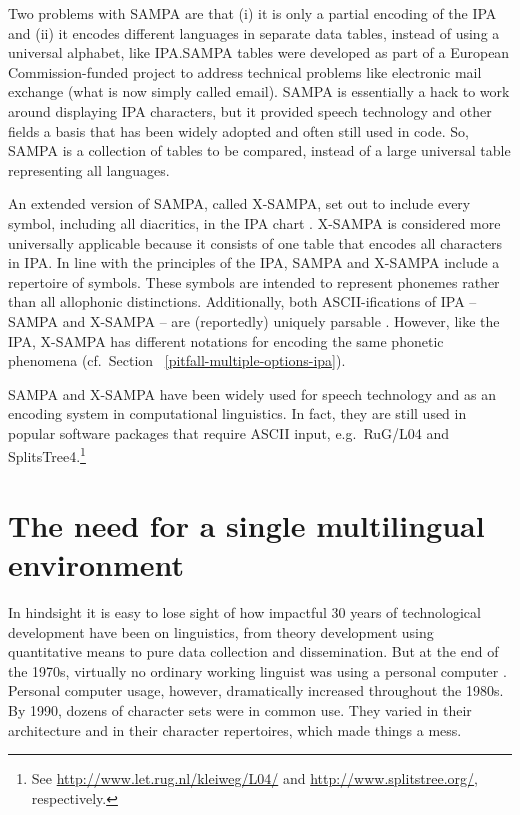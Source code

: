 Two problems with SAMPA are that (i) it is only a partial encoding of the IPA
and (ii) it encodes different languages in separate data tables, instead of
using a universal alphabet, like IPA.\@ SAMPA tables were developed as part of a
European Commission-funded project to address technical problems like electronic
mail exchange (what is now simply called email). SAMPA is essentially a hack to
work around displaying IPA characters, but it provided speech technology and
other fields a basis that has been widely adopted and often still used in code.
So, SAMPA is a collection of tables to be compared, instead of a large universal
table representing all languages. 

An extended version of SAMPA, called X-SAMPA, set out to include every symbol,
including all diacritics, in the IPA chart \citep{Wells1995}. X-SAMPA is
considered more universally applicable because it consists of one table that
encodes all characters in IPA. In line with the principles of the IPA, SAMPA and
X-SAMPA include a repertoire of symbols. These symbols are intended to represent
phonemes rather than all allophonic distinctions. Additionally, both
ASCII-ifications of IPA -- SAMPA and X-SAMPA -- are
(reportedly) uniquely parsable \citep{Wells1995}. However, like the IPA, X-SAMPA
has different notations for encoding the same phonetic phenomena (cf.\ Section~
\ref{pitfall-multiple-options-ipa}).

SAMPA and X-SAMPA have been widely used for speech technology and as an encoding
system in computational linguistics. In fact, they are still used in popular
software packages that require ASCII input, e.g.~RuG/L04 and SplitsTree4.\footnote{See
\url{http://www.let.rug.nl/kleiweg/L04/} and \url{http://www.splitstree.org/},
respectively.}


\section{The need for a single multilingual environment}
\label{need-for-multilingual-environment}

In hindsight it is easy to lose sight of how impactful 30 years of technological
development have been on linguistics, from theory development using quantitative
means to pure data collection and dissemination. But at the end of the 1970s,
virtually no ordinary working linguist was using a personal computer
\citep{Simons1996}. Personal computer usage, however, dramatically increased
throughout the 1980s. By 1990, dozens of character sets were in common use. They
varied in their architecture and in their character repertoires, which made
things a mess. 

